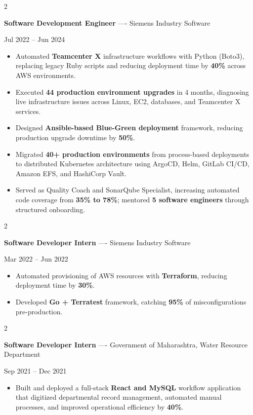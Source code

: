 \documentclass[10pt, letterpaper]{article}
\newenvironment{highlights}{
    \begin{itemize}[
        topsep=0.10 cm,
        parsep=0.06 cm,
        partopsep=0pt,
        itemsep=0.06 cm,
        leftmargin=12pt
    ]
}{
    \end{itemize}
}
\newenvironment{twocolentry}[2][]{
    \onecolentry
    \def\secondColumn{#2}
    \setcolumnwidth{\fill, 4.5 cm}
    \begin{paracol}{2}
}{
    \switchcolumn \raggedleft \secondColumn
    \end{paracol}
    \endonecolentry
}
\begin{document}
\vspace{0.15 cm}

\begin{twocolentry}{Jul 2022 -- Jun 2024}
\textbf{Software Development Engineer} ---- Siemens Industry Software
\end{twocolentry}
\begin{highlights}
  \item Automated \textbf{Teamcenter X} infrastructure workflows with Python (Boto3), replacing legacy Ruby scripts and reducing deployment time by \textbf{40\%} across AWS environments.
  \item Executed \textbf{44 production environment upgrades} in 4 months, diagnosing live infrastructure issues across Linux, EC2, databases, and Teamcenter X services.
  \item Designed \textbf{Ansible-based Blue-Green deployment} framework, reducing production upgrade downtime by \textbf{50\%}.
  \item Migrated \textbf{40+ production environments} from process-based deployments to distributed Kubernetes architecture using ArgoCD, Helm, GitLab CI/CD, Amazon EFS, and HashiCorp Vault.
  \item Served as Quality Coach and SonarQube Specialist, increasing automated code coverage from \textbf{35\% to 78\%}; mentored \textbf{5 software engineers} through structured onboarding.
\end{highlights}

\vspace{0.15 cm}

\begin{twocolentry}{Mar 2022 -- Jun 2022}
\textbf{Software Developer Intern} ---- Siemens Industry Software
\end{twocolentry}
\begin{highlights}
  \item Automated provisioning of AWS resources with \textbf{Terraform}, reducing deployment time by \textbf{30\%}.
  \item Developed \textbf{Go + Terratest} framework, catching \textbf{95\%} of misconfigurations pre-production.
\end{highlights}

\vspace{0.15 cm}

\begin{twocolentry}{Sep 2021 -- Dec 2021}
\textbf{Software Developer Intern} ---- Government of Maharashtra, Water Resource Department
\end{twocolentry}
\begin{highlights}
  \item Built and deployed a full-stack \textbf{React and MySQL} workflow application that digitized departmental record management, automated manual processes, and improved operational efficiency by \textbf{40\%}.
\end{highlights}
\end{document}
